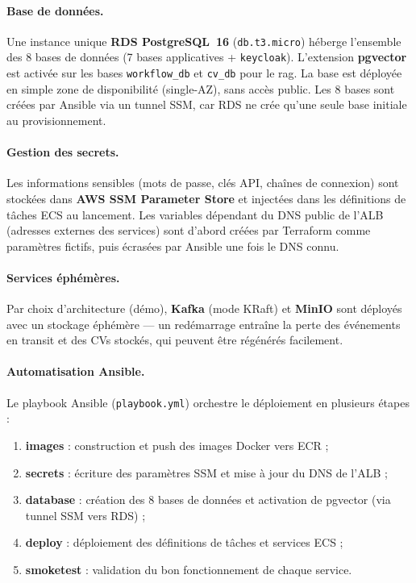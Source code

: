 \paragraph{Base de données.} Une instance unique \textbf{RDS PostgreSQL~16} (\texttt{db.t3.micro}) héberge l'ensemble des 8 bases de données (7 bases applicatives + \texttt{keycloak}). L'extension \textbf{pgvector} est activée sur les bases \texttt{workflow\_db} et \texttt{cv\_db} pour le \gls{rag}. La base est déployée en simple zone de disponibilité (single-AZ), sans accès public. Les 8 bases sont créées par Ansible via un tunnel SSM, car RDS ne crée qu'une seule base initiale au provisionnement.

\paragraph{Gestion des secrets.} Les informations sensibles (mots de passe, clés API, chaînes de connexion) sont stockées dans \textbf{AWS SSM Parameter Store} et injectées dans les définitions de tâches ECS au lancement. Les variables dépendant du DNS public de l'ALB (adresses externes des services) sont d'abord créées par Terraform comme paramètres fictifs, puis écrasées par Ansible une fois le DNS connu.

\paragraph{Services éphémères.} Par choix d'architecture (démo), \textbf{Kafka} (mode KRaft) et \textbf{MinIO} sont déployés avec un stockage éphémère — un redémarrage entraîne la perte des événements en transit et des CVs stockés, qui peuvent être régénérés facilement.

\paragraph{Automatisation Ansible.} Le playbook Ansible (\texttt{playbook.yml}) orchestre le déploiement en plusieurs étapes :
\begin{enumerate}
    \item \textbf{images} : construction et push des images Docker vers ECR ;
    \item \textbf{secrets} : écriture des paramètres SSM et mise à jour du DNS de l'ALB ;
    \item \textbf{database} : création des 8 bases de données et activation de pgvector (via tunnel SSM vers RDS) ;
    \item \textbf{deploy} : déploiement des définitions de tâches et services ECS ;
    \item \textbf{smoketest} : validation du bon fonctionnement de chaque service.
\end{enumerate}

